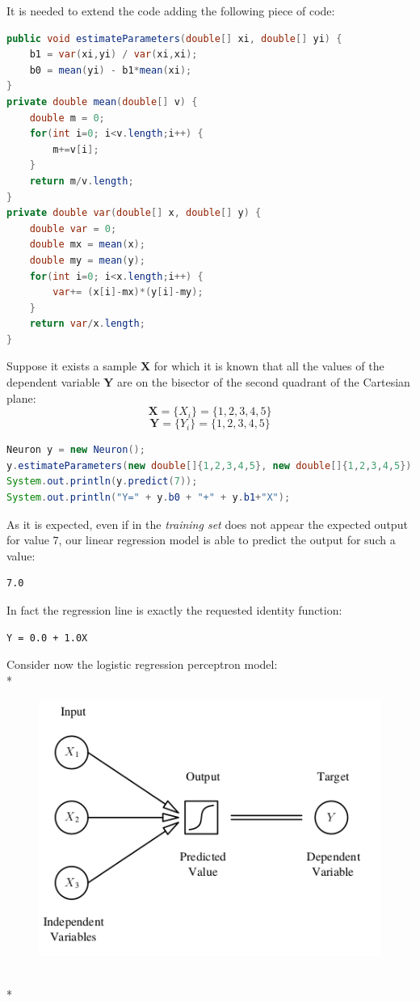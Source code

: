 \documentclass[10pt,a4paper]{article}
\begin{document}
	It is needed to extend the code adding the following piece of code:
	\begin{lstlisting}[language = Java]
public void estimateParameters(double[] xi, double[] yi) {
	b1 = var(xi,yi) / var(xi,xi);
	b0 = mean(yi) - b1*mean(xi);
}
private double mean(double[] v) {
	double m = 0;
	for(int i=0; i<v.length;i++) {
		m+=v[i];
	}
	return m/v.length;
}
private double var(double[] x, double[] y) {
	double var = 0;
	double mx = mean(x);
	double my = mean(y);
	for(int i=0; i<x.length;i++) {
		var+= (x[i]-mx)*(y[i]-my);
	}
	return var/x.length;
}
\end{lstlisting}
Suppose it exists a sample \textbf{X} for which it is known that all the values of the dependent variable \textbf{Y} are on the bisector of the second quadrant of the Cartesian plane:
$$
\textbf{X} = \{X_i\} = \{1,2,3,4,5\}
$$
$$
\textbf{Y} = \{Y_i\} = \{1,2,3,4,5\}
$$
\begin{lstlisting}[language = Java]
Neuron y = new Neuron();
y.estimateParameters(new double[]{1,2,3,4,5}, new double[]{1,2,3,4,5});
System.out.println(y.predict(7));
System.out.println("Y=" + y.b0 + "+" + y.b1+"X");
\end{lstlisting}
As it is expected, even if in the \emph{training set} does not appear the expected output for value $7$, our linear regression model is able to predict the output for such a value:
\begin{lstlisting}
7.0
\end{lstlisting}
In fact the regression line is exactly the requested identity function:
\begin{lstlisting}
Y = 0.0 + 1.0X
\end{lstlisting}
Consider now the logistic regression perceptron model:\\*
	\begin{figure}[h!]
	\centering
	\includegraphics[scale=1.7]{img/logreg}
\end{figure}\\*
\end{document}
